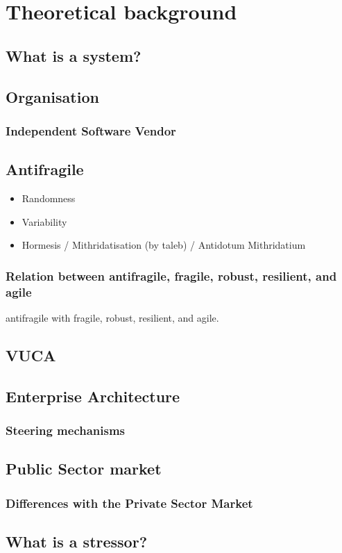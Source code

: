 \chapter{Theoretical background}
\label{ch:theoreticalbackground}

\section{What is a system?}
\label{sec:tbsystem}

\section{Organisation}
\label{sec:tborganisation}

\subsection{Independent Software Vendor}
\label{sub:tbisv}

\section{Antifragile}
\label{sec:tbantifragile}

\begin{itemize}
	\item{Randomness}
	\item{Variability}
	\item{Hormesis / Mithridatisation (by taleb) / Antidotum Mithridatium}
\end{itemize}

\subsection{Relation between antifragile, fragile, robust, resilient, and agile}
\label{sub:tbrelatedtoantifragile}

\gls{antifragile} with \gls{fragile}, \gls{robust}, \gls{resilient}, and \gls{agile}.


\section{VUCA}
\label{sec:tbvuca}

\section{Enterprise Architecture}
\label{sec:tbea}

\subsection{Steering mechanisms}
\label{sub:tbeasteering}

\section{Public Sector market}
\label{sec:tbpsmarket}

\subsection{Differences with the Private Sector Market}
\label{sub:tbdifferenceprivatesector}

\section{What is a stressor?}
\label{sec:stressor}

